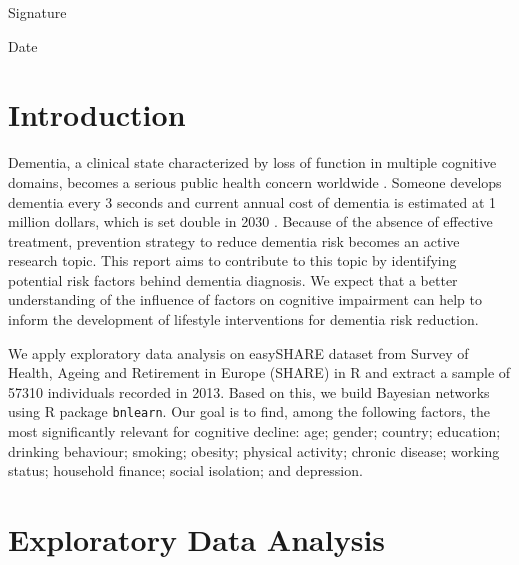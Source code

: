 \documentclass[11pt,twoside]{article}
\numberwithin{Theorem}{section}
\numberwithin{Definition}{section}
\numberwithin{Lemma}{section}
\numberwithin{Algorithm}{section}
\numberwithin{equation}{section}
\newcommand{\dottedline}[1]{\makebox[#1]{.\dotfill}}
\begin{document}
\vspace{1cm}

Signature \dottedline{8cm}

\vspace{5mm}

Date \dottedline{8cm}

\clearpage


\pagestyle{plain}
\setcounter{page}{1}

\tableofcontents

\setcounter{page}{1}

\nocite{*}

\clearpage

\section{Introduction}
\label{sec:intro}

Dementia, a clinical state characterized by loss of function in multiple cognitive domains, becomes a serious public health concern worldwide \cite{seixas2014bayesian}. Someone develops dementia every 3 seconds and current annual cost of dementia is estimated at 1 million dollars, which is set double in 2030 \cite{alzheimer2019world}. Because of the absence of effective treatment, prevention strategy to reduce dementia risk becomes an active research topic. This report aims to contribute to this topic by identifying potential risk factors behind dementia diagnosis. We expect that a better understanding of the influence of factors on cognitive impairment can help to inform the development of lifestyle interventions for dementia risk reduction. 

We apply exploratory data analysis on easySHARE dataset from Survey of Health, Ageing and Retirement in Europe (SHARE) in R and extract a sample of 57310 individuals recorded in 2013. Based on this, we build Bayesian networks using R package \texttt{bnlearn}. Our goal is to find, among the following factors, the most significantly relevant for cognitive decline: age; gender; country; education; drinking behaviour; smoking; obesity; physical activity; chronic disease; working status; household finance; social isolation; and depression. 

\section{Exploratory Data Analysis}  
\label{sec: EDA}
\end{document}
